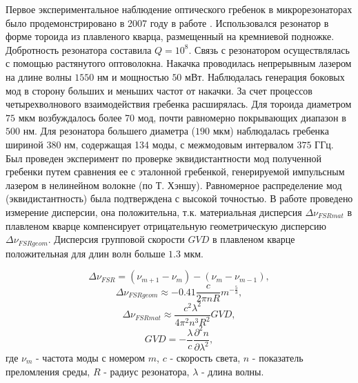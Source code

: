 Первое экспериментальное наблюдение оптического гребенок в микрорезонаторах было продемонстрировано в 2007 году в работе \cite{comb_nature_2007}. Использовался резонатор в форме тороида из плавленого кварца, размещенный на кремниевой подножке. Добротность резонатора составила $Q=10^8$. Связь с резонатором осуществлялась с помощью растянутого оптоволокна. Накачка проводилась непрерывным лазером на длине волны $1550$ нм и мощностью $50$ мВт. Наблюдалась генерация боковых мод в сторону больших и меньших частот от накачки. За счет процессов четырехволнового взаимодействия гребенка расширялась. Для тороида диаметром $75$ мкм возбуждалось более 70 мод, почти равномерно покрывающих диапазон в $500$ нм. Для резонатора большего диаметра ($190$ мкм) наблюдалась гребенка шириной $380$ нм, содержащая 134 моды, с межмодовым интервалом $375$ ГГц. Был проведен эксперимент по проверке эквидистантности мод полученной гребенки путем сравнения ее с эталонной гребенкой, генерируемой импульсным лазером в нелинейном волокне (по Т. Хэншу). Равномерное распределение мод (эквидистантность) была подтверждена с высокой точностью. В работе проведено измерение дисперсии, она положительна, т.к. материальная дисперсия $\Delta\nu_{FSRmat}$ в плавленом кварце компенсирует отрицательную геометрическую дисперсию $\Delta\nu_{FSRgeom}$. Дисперсия групповой скорости $GVD$ в плавленом кварце положительная для длин волн больше $1.3$ мкм.

\begin{equation}
\Delta\nu_{FSR}=(\nu_{m+1}-\nu_m)-(\nu_m-\nu_{m-1}),
\end{equation}
\begin{equation}
\Delta\nu_{FSRgeom}\approx-0.41\frac{c}{2\pi nR}m^{-\frac{5}{3}},
\end{equation}
\begin{equation}
\Delta\nu_{FSRmat}\approx\frac{c^2\lambda^2}{4\pi^2n^3R^2}GVD,
\end{equation}
\begin{equation}
GVD=-\frac{\lambda}{c}\frac{\partial^2 n}{\partial \lambda^2},
\end{equation}
где $\nu_m$ - частота моды с номером $m$, $c$ - скорость света, $n$ - показатель преломления среды, $R$ - радиус резонатора, $\lambda$ - длина волны.

